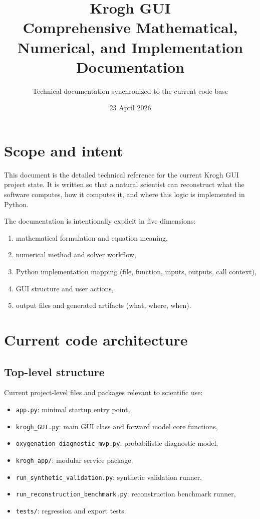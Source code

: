 \documentclass[12pt,a4paper]{article}
\title{Krogh GUI\\Comprehensive Mathematical, Numerical, and Implementation Documentation}
\author{Technical documentation synchronized to the current code base}
\date{23 April 2026}
\begin{document}
\sloppy
\maketitle
\tableofcontents
\newpage

\section{Scope and intent}
This document is the detailed technical reference for the current Krogh GUI project state. It is written so that a natural scientist can reconstruct what the software computes, how it computes it, and where this logic is implemented in Python.

The documentation is intentionally explicit in five dimensions:
\begin{enumerate}
    \item mathematical formulation and equation meaning,
    \item numerical method and solver workflow,
    \item Python implementation mapping (file, function, inputs, outputs, call context),
    \item GUI structure and user actions,
    \item output files and generated artifacts (what, where, when).
\end{enumerate}

\section{Current code architecture}
\subsection{Top-level structure}
Current project-level files and packages relevant to scientific use:
\begin{itemize}
    \item \texttt{app.py}: minimal startup entry point,
    \item \texttt{krogh\_GUI.py}: main GUI class and forward model core functions,
    \item \texttt{oxygenation\_diagnostic\_mvp.py}: probabilistic diagnostic model,
    \item \texttt{krogh\_app/}: modular service package,
    \item \texttt{run\_synthetic\_validation.py}: synthetic validation runner,
    \item \texttt{run\_reconstruction\_benchmark.py}: reconstruction benchmark runner,
    \item \texttt{tests/}: regression and export tests.
\end{itemize}
\end{document}
